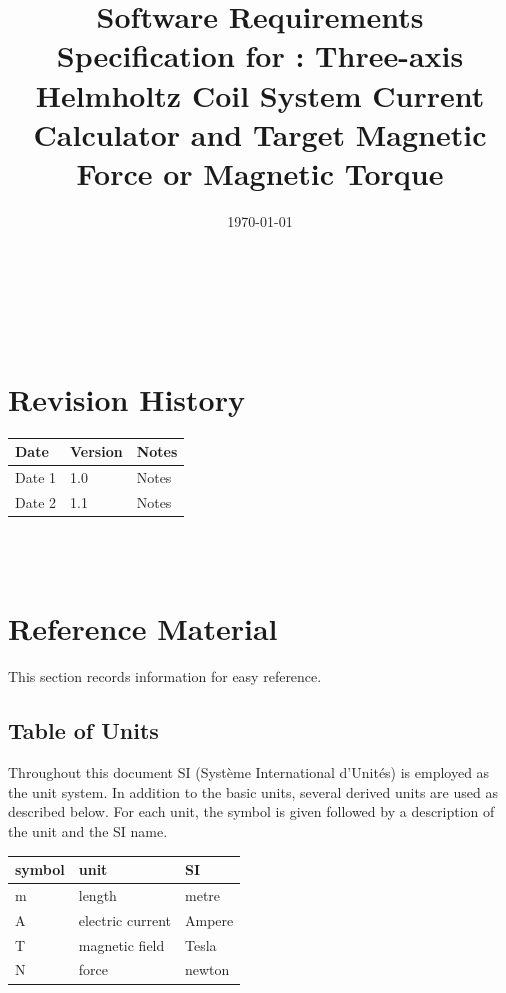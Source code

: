 \documentclass[12pt]{article}
\begin{document}
\title{Software Requirements Specification for \progname: Three-axis Helmholtz Coil System Current Calculator and Target Magnetic Force or Magnetic Torque} 
\author{\authname}
\date{\today}
	
\maketitle

~\newpage


\tableofcontents

~\newpage

\section*{Revision History}

\begin{tabularx}{\textwidth}{p{3cm}p{2cm}X}
\toprule {\bf Date} & {\bf Version} & {\bf Notes}\\
\midrule
Date 1 & 1.0 & Notes\\
Date 2 & 1.1 & Notes\\
\bottomrule
\end{tabularx}

~\\

~\newpage

\section{Reference Material}

This section records information for easy reference.

\subsection{Table of Units}

Throughout this document SI (Syst\`{e}me International d'Unit\'{e}s) is employed
as the unit system.  In addition to the basic units, several derived units are
used as described below.  For each unit, the symbol is given followed by a
description of the unit and the SI name.
~\newline

\renewcommand{\arraystretch}{1.2}
  \noindent \begin{tabular}{l l l} 
    \toprule		
    \textbf{symbol} & \textbf{unit} & \textbf{SI}\\
    \midrule 
    \si{\metre} & length & metre\\
    \si{\ampere} & electric current & Ampere\\
    \si{\tesla} & magnetic field & Tesla\\
     \si{\newton} & force & newton\\
    \bottomrule
  \end{tabular}
\end{document}
